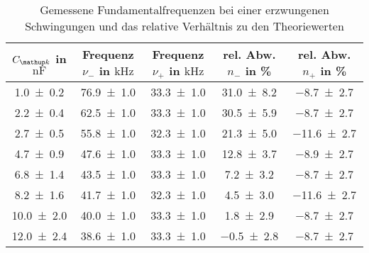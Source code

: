 \begin{table}
\centering
\caption{ Gemessene Fundamentalfrequenzen bei einer erzwungenen Schwingungen und das relative Verhältnis zu den Theoriewerten}
\label{tab:teilb_schwingungen_prak_theo}
\begin{tabular}{S S S S S }
\toprule
{$C\ua{k}$ in $\si{\nano\farad}$} & {Frequenz $\nu_-$ in $\si{\kilo\hertz}$} & {Frequenz $\nu_+$ in $\si{\kilo\hertz}$}& {rel. Abw. $n_-$ in \%} & {rel. Abw. $n_+$ in \%}  \\
\midrule
 \num{1.0\pm0.2} & \num{76.9\pm1.0} & \num{33.3\pm1.0} & \num{31.0\pm8.2} & \num{-8.7\pm2.7}\\
\num{2.2\pm0.4} & \num{62.5\pm1.0} & \num{33.3\pm1.0} & \num{30.5\pm5.9} & \num{-8.7\pm2.7}\\
\num{2.7\pm0.5} & \num{55.8\pm1.0} & \num{32.3\pm1.0} & \num{21.3\pm5.0} & \num{-11.6\pm2.7}\\
\num{4.7\pm0.9} & \num{47.6\pm1.0} & \num{33.3\pm1.0} & \num{12.8\pm3.7} & \num{-8.9\pm2.7}\\
\num{6.8\pm1.4} & \num{43.5\pm1.0} & \num{33.3\pm1.0} & \num{7.2\pm3.2} & \num{-8.7\pm2.7}\\
\num{8.2\pm1.6} & \num{41.7\pm1.0} & \num{32.3\pm1.0} & \num{4.5\pm3.0} & \num{-11.6\pm2.7}\\
\num{10.0\pm2.0} & \num{40.0\pm1.0} & \num{33.3\pm1.0} & \num{1.8\pm2.9} & \num{-8.7\pm2.7}\\
\num{12.0\pm2.4} & \num{38.6\pm1.0} & \num{33.3\pm1.0} & \num{-0.5\pm2.8} & \num{-8.7\pm2.7}\\
\bottomrule
\end{tabular}
\end{table}
